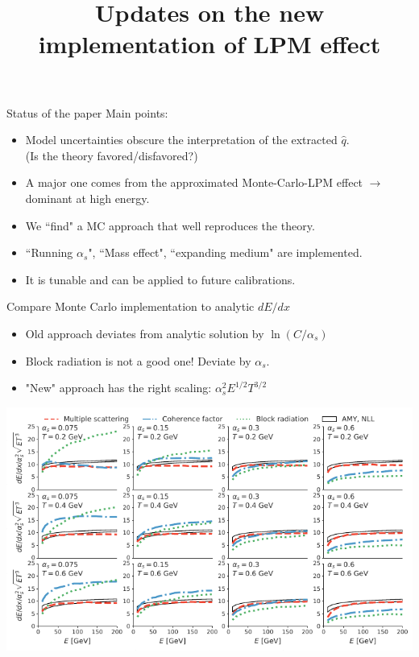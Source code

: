 \documentclass[11pt]{beamer}
\title{Updates on the new implementation of LPM effect}
\begin{document}
\begin{frame}
\titlepage
\end{frame}


\begin{frame}{Status of the paper}
Main points:
\begin{itemize}
\item Model uncertainties obscure the interpretation of the extracted $\hat{q}$. \\(Is the theory favored/disfavored?)
\item A major one comes from the approximated Monte-Carlo-LPM effect $\rightarrow$ dominant at high energy.
\item We ``find" a MC approach that well reproduces the theory.
\item ``Running $\alpha_s$", ``Mass effect", ``expanding medium" are implemented.
\item It is tunable and can be applied to future calibrations.
\end{itemize}
\end{frame}

\begin{frame}{Compare Monte Carlo implementation to analytic $dE/dx$}
\begin{itemize}
\item Old approach deviates from analytic solution by $\ln(C/\alpha_s)$
\item Block radiation is not a good one! Deviate by $\alpha_s$.
\item "New" approach has the right scaling: $\alpha_s^2 E^{1/2} T^{3/2}$
\end{itemize}
\begin{center}
\includegraphics[width=.85\textwidth]{Eloss_infinite.pdf}
\end{center}
\end{frame}
\end{document}
